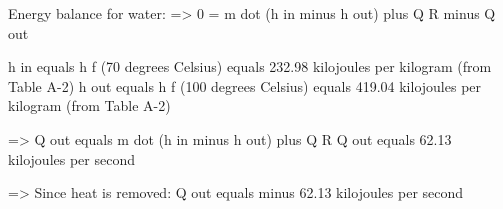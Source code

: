 Energy balance for water:  
=> 0 = m dot (h in minus h out) plus Q R minus Q out  

h in equals h f (70 degrees Celsius) equals 232.98 kilojoules per kilogram (from Table A-2)  
h out equals h f (100 degrees Celsius) equals 419.04 kilojoules per kilogram (from Table A-2)  

=> Q out equals m dot (h in minus h out) plus Q R  
Q out equals 62.13 kilojoules per second  

=> Since heat is removed:  
Q out equals minus 62.13 kilojoules per second